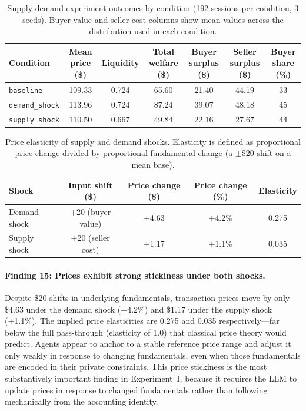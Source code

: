 \begin{table}[ht]
\centering
\caption{Supply-demand experiment outcomes by condition (192 sessions per condition, 3 seeds).  Buyer value and seller cost columns show mean values across the distribution used in each condition.}
\label{tab:supply-demand}
\begin{tabular}{@{}lcccccc@{}}
\toprule
Condition & Mean price (\$) & Liquidity & Total welfare (\$) & Buyer surplus (\$) & Seller surplus (\$) & Buyer share (\%) \\
\midrule
\texttt{baseline}      & 109.33 & 0.724 & 65.60 & 21.40 & 44.19 & 33 \\
\texttt{demand\_shock} & 113.96 & 0.724 & 87.24 & 39.07 & 48.18 & 45 \\
\texttt{supply\_shock} & 110.50 & 0.667 & 49.84 & 22.16 & 27.67 & 44 \\
\bottomrule
\end{tabular}
\end{table}

\begin{table}[ht]
\centering
\caption{Price elasticity of supply and demand shocks.  Elasticity is defined as proportional price change divided by proportional fundamental change (a $\pm$\$20 shift on a mean base).}
\label{tab:elasticities}
\begin{tabular}{@{}lcccc@{}}
\toprule
Shock & Input shift (\$) & Price change (\$) & Price change (\%) & Elasticity \\
\midrule
Demand shock & $+$20 (buyer value) & $+$4.63 & $+$4.2\% & 0.275 \\
Supply shock & $+$20 (seller cost) & $+$1.17 & $+$1.1\% & 0.035 \\
\bottomrule
\end{tabular}
\end{table}

\paragraph{Finding 15: Prices exhibit strong stickiness under both shocks.}
Despite \$20 shifts in underlying fundamentals, transaction prices move by only \$4.63 under the demand shock (+4.2\%) and \$1.17 under the supply shock (+1.1\%).  The implied price elasticities are 0.275 and 0.035 respectively---far below the full pass-through (elasticity of 1.0) that classical price theory would predict.  Agents appear to anchor to a stable reference price range and adjust it only weakly in response to changing fundamentals, even when those fundamentals are encoded in their private constraints.  This price stickiness is the most substantively important finding in Experiment~I, because it requires the LLM to update prices in response to changed fundamentals rather than following mechanically from the accounting identity.

